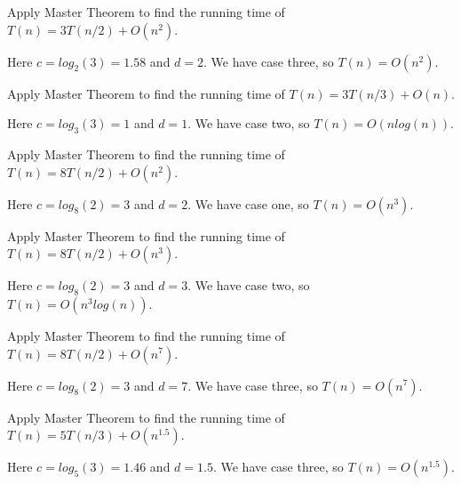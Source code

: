 \documentclass[12pt]{article}
\begin{document}
\begin{question}
Apply Master Theorem to find the running time of $T(n) = 3T(n/2) + O(n^2)$.
\end{question}

\begin{solution}
Here $c = log_{2}(3) = 1.58$ and $d = 2$. We have case three, so $T(n) = O(n^2)$.
\end{solution}

\begin{question}
Apply Master Theorem to find the running time of $T(n) = 3T(n/3) + O(n)$.
\end{question}

\begin{solution}
Here $c = log_{3}(3) = 1$ and $d = 1$. We have case two, so $T(n) = O(n log(n))$.
\end{solution}

\begin{question}
Apply Master Theorem to find the running time of $T(n) = 8T(n/2) + O(n^2)$.
\end{question}

\begin{solution}
Here $c = log_{8}(2) = 3$ and $d = 2$. We have case one, so $T(n) = O(n^3)$.
\end{solution}

\begin{question}
Apply Master Theorem to find the running time of $T(n) = 8T(n/2) + O(n^3)$.
\end{question}

\begin{solution}
Here $c = log_{8}(2) = 3$ and $d = 3$. We have case two, so $T(n) = O(n^3 log(n))$.
\end{solution}

\begin{question}
Apply Master Theorem to find the running time of $T(n) = 8T(n/2) + O(n^7)$.
\end{question}

\begin{solution}
Here $c = log_{8}(2) = 3$ and $d = 7$. We have case three, so $T(n) = O(n^7)$.
\end{solution}

\begin{question}
Apply Master Theorem to find the running time of $T(n) = 5T(n/3) + O(n^{1.5})$.
\end{question}

\begin{solution}
Here $c = log_{5}(3) = 1.46$ and $d = 1.5$. We have case three, so $T(n) = O(n^{1.5})$.
\end{solution}
\end{document}

